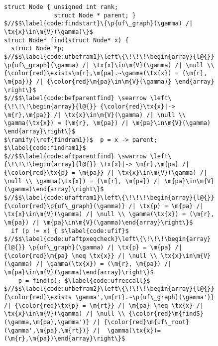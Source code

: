 \begin{figure}[t]
\vspace{-1ex}
  \begin{lstlisting}[multicols=2]
struct Node { unsigned int rank; 
              struct Node * parent; }
$//$$\label{code:findstart}\{\p{uf\_graph}(\gamma) /| \tx{x}\in\m{V}(\gamma)\}$
struct Node* find(struct Node* x) {
  struct Node *p;
$//$$\label{code:ufbefram1}\left\{\!\!\!\begin{array}{l@{}} \p{uf\_graph}(\gamma) /| \tx{x}\in\m{V}(\gamma) /| \null \\ {\color{red}\exists\m{r},\m{pa}.~\gamma(\tx{x}) = (\m{r}, \m{pa})} /| {\color{red}\m{pa}\in\m{V}(\gamma)} \end{array} \right\}$
$//$$\label{code:befparentfind} \searrow \left\{\!\!\!\begin{array}{l@{}} {\color{red}\tx{x}|-> \m{r},\m{pa}} /| \tx{x}\in\m{V}(\gamma) /| \null \\ \gamma(\tx{x}) = (\m{r}, \m{pa}) /| \m{pa}\in\m{V}(\gamma) \end{array}\right\}$
$\ramify(\ref{findram1})$  p = x -> parent; $\label{code:findram1}$
$//$$\label{code:aftparentfind} \swarrow \left\{\!\!\!\begin{array}{l@{}} \tx{x}|-> \m{r},\m{pa} /| {\color{red}\tx{p} = \m{pa}} /| \tx{x}\in\m{V}(\gamma) /| \null \\ \gamma(\tx{x}) = (\m{r}, \m{pa}) /| \m{pa}\in\m{V}(\gamma)\end{array}\right\}$
$//$$\label{code:ufaftram1}\left\{\!\!\!\begin{array}{l@{}} {\color{red}\p{uf\_graph}(\gamma)} /| \tx{p} = \m{pa} /| \tx{x}\in\m{V}(\gamma) /| \null \\ \gamma(\tx{x}) = (\m{r}, \m{pa}) /| \m{pa}\in\m{V}(\gamma)\end{array}\right\}$
  if (p != x) { $\label{code:ufif}$
$//$$\label{code:ufaftpxeqcheck}\left\{\!\!\!\begin{array}{l@{}} \p{uf\_graph}(\gamma) /| \tx{p} = \m{pa} /| {\color{red}\m{pa} \neq \tx{x}} /| \null \\ \tx{x}\in\m{V}(\gamma) /| \gamma(\tx{x}) = (\m{r}, \m{pa}) /| \m{pa}\in\m{V}(\gamma)\end{array}\right\}$
    p = find(p); $\label{code:ufreccall}$
$//$$\label{code:ufbefram2}\left\{\!\!\!\begin{array}{l@{}}{\color{red}\exists \gamma',\m{rt}.~\p{uf\_graph}(\gamma')} /| {\color{red}\tx{p} = \m{rt}} /| \m{pa} \neq \tx{x} /| \tx{x}\in\m{V}(\gamma) /| \null \\ {\color{red}\m{findS}(\gamma,\m{pa},\gamma')} /| {\color{red}\m{uf\_root}(\gamma',\m{pa},\m{rt})} /|  \gamma(\tx{x})=(\m{r},\m{pa})\end{array}\right\}$

\end{lstlisting}
\end{figure}
